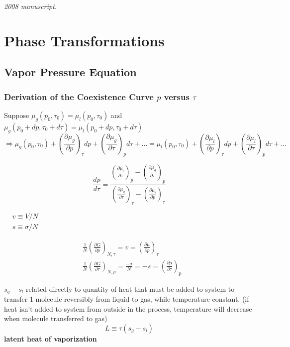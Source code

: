 \noindent\textit{2008 manuscript.}

\section{Phase Transformations}

\subsection*{Vapor Pressure Equation}

\subsubsection*{Derivation of the Coexistence Curve $p$ versus $\tau$}

Suppose $\mu_g(p_0,\tau_0) = \mu_l(p_0,\tau_0)$ and $\mu_g(p_0 + dp, \tau_0 + d\tau) = \mu_l(p_0 + dp, \tau_0 + d\tau)$
\[
\Longrightarrow \mu_g(p_0,\tau_0) + \left( \frac{ \partial \mu_g }{ \partial p} \right)_{\tau} dp + \left( \frac{ \partial \mu_g }{ \partial \tau} \right)_{p} d\tau + \dots = \mu_l(p_0,\tau_0) + \left( \frac{ \partial \mu_l }{ \partial p} \right)_{\tau} dp + \left( \frac{ \partial \mu_l }{ \partial \tau} \right)_{p} d\tau + \dots
\]

\[
\frac{dp}{d\tau} = \frac{ \left( \frac{ \partial \mu_l }{ \partial \tau} \right)_p - \left( \frac{ \partial \mu_g }{ \partial \tau} \right)_p }{ \left( \frac{ \partial \mu_g }{ \partial \tau} \right)_{\tau} - \left( \frac{ \partial \mu_l }{ \partial p} \right)_{\tau} }
\]




$\begin{aligned}
  & v \equiv V/N \\ 
  & s \equiv \sigma /N
\end{aligned}$

\[
\begin{aligned}
  & \frac{1}{N} \left( \frac{ \partial G}{ \partial p } \right)_{N,\tau} = v = \left( \frac{ \partial \mu }{ \partial p } \right)_{\tau} \\ 
  & \frac{1}{N} \left( \frac{ \partial G}{ \partial \tau} \right)_{N,p} = \frac{-\sigma}{N} = -s = \left( \frac{ \partial \mu }{ \partial \tau} \right)_p
\end{aligned}
\]


$s_g-s_l$ related directly to quantity of heat that must be added to system to transfer 1 molecule reversibly from liquid to gas, while temperature constant.  (if heat isn't added to system from outside in the process, temperature will decrease when molecule transferred to gas)
\begin{equation}
  L \equiv \tau(s_g - s_l)
\end{equation}
\textbf{latent heat of vaporization}

